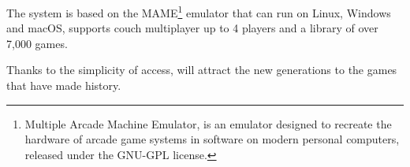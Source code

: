The system is based on the MAME\footnote{Multiple Arcade Machine Emulator, is an emulator designed to recreate the hardware of arcade game systems in software on modern personal computers, released under the GNU-GPL license.} emulator that can run on Linux, Windows and macOS, supports couch multiplayer up to 4 players and a library of over 7,000 games.

Thanks to the simplicity of access, will attract the new generations to the games that have made history.